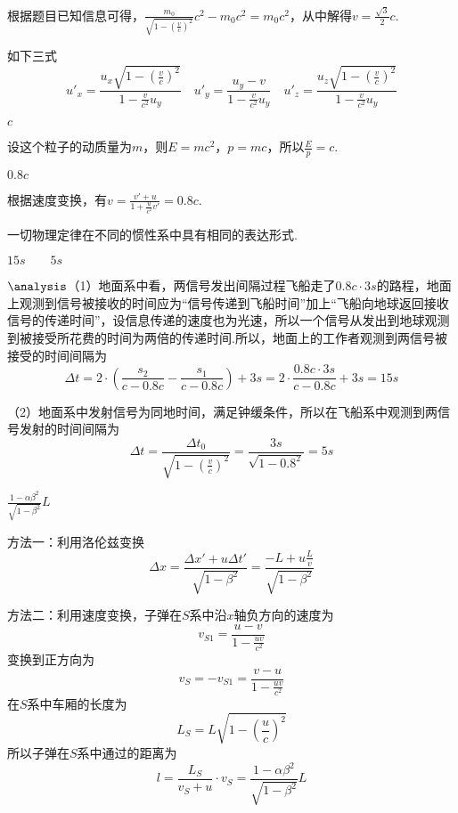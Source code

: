 \documentclass[b5paper,opensource]{./template/qyxf-book}
\begin{document}
\solve
根据题目已知信息可得，$\frac{m_0}{\sqrt{1-(\frac{v}{c})^2}}c^2-m_0c^2=m_0c^2$，从中解得$v=\frac{\sqrt{3}}{2}c$.

 如下三式
\begin{equation*}
u'_x=\frac{u_x\sqrt{1-(\frac{v}{c})^2}}{1-\frac{v}{c^2}u_y}\quad u'_y=\frac{u_y-v}{1-\frac{v}{c^2}u_y}\quad u'_z=\frac{u_z\sqrt{1-(\frac{v}{c})^2}}{1-\frac{v}{c^2}u_y}
\end{equation*}

 $c$

\solve
设这个粒子的动质量为$m$，则$E=mc^2$，$p=mc$，所以$\frac{E}{p}=c$.

 $0.8c$

\solve
根据速度变换，有$v=\frac{v'+u}{1+\frac{u}{c^2}v'}=0.8c$.

一切物理定律在不同的惯性系中具有相同的表达形式.

$15s \qquad 5s$

\solve
$\analysis$（1）地面系中看，两信号发出间隔过程飞船走了$0.8c\cdot3s$的路程，地面上观测到信号被接收的时间应为“信号传递到飞船时间”加上“飞船向地球返回接收信号的传递时间”，设信息传递的速度也为光速，所以一个信号从发出到地球观测到被接受所花费的时间为两倍的传递时间.所以，地面上的工作者观测到两信号被接受的时间间隔为
\begin{equation*}
\Delta t=2\cdot(\frac{s_2}{c-0.8c}-\frac{s_1}{c-0.8c})+3s=2\cdot\frac{0.8c\cdot3s}{c-0.8c}+3s=15s
\end{equation*}

（2）地面系中发射信号为同地时间，满足钟缓条件，所以在飞船系中观测到两信号发射的时间间隔为
\begin{equation*}
\Delta t=\frac{\Delta t_0}{\sqrt{1-(\frac{v}{c})^2}}=\frac{3s}{\sqrt{1-0.8^2}}=5s
\end{equation*}

 $\frac{1-\alpha\beta^2}{\sqrt{1-\beta^2}}L$

\solve
方法一：利用洛伦兹变换
\begin{equation*}
\Delta x=\frac{\Delta x'+u\Delta t'}{\sqrt{1-\beta^2}}=\frac{-L+u\frac{L}{v}}{\sqrt{1-\beta^2}}
\end{equation*}

方法二：利用速度变换，子弹在$S$系中沿$x$轴负方向的速度为
\begin{equation*}
v_{S1}=\frac{u-v}{1-\frac{uv}{c^2}}
\end{equation*}
变换到正方向为
\begin{equation*}
v_S=-v_{S1}=\frac{v-u}{1-\frac{uv}{c^2}}
\end{equation*}
在$S$系中车厢的长度为
\begin{equation*}
L_S=L\sqrt{1-(\frac{u}{c})^2}
\end{equation*}
所以子弹在$S$系中通过的距离为
\begin{equation*}
l=\frac{L_S}{v_S+u}\cdot v_S=\frac{1-\alpha\beta^2}{\sqrt{1-\beta^2}}L
\end{equation*}
\end{document}
